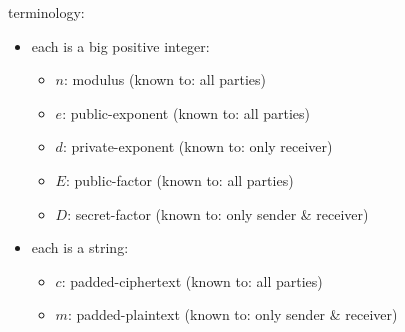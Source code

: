 terminology:
\begin{itemize}
\item each  is a big positive integer:
  \begin{itemize}
  \item $n$: modulus (known to: all parties)
  \item $e$: public-exponent (known to: all parties)
  \item $d$: private-exponent (known to: only receiver)
  \item $E$: public-factor (known to: all parties)
  \item $D$: secret-factor
    (known to: only sender \& receiver)
  \end{itemize}
\item each  is a string:
  \begin{itemize}
  \item $c$: padded-ciphertext (known to: all parties)
  \item $m$: padded-plaintext
    (known to: only sender \& receiver)
  \end{itemize}
\end{itemize}

